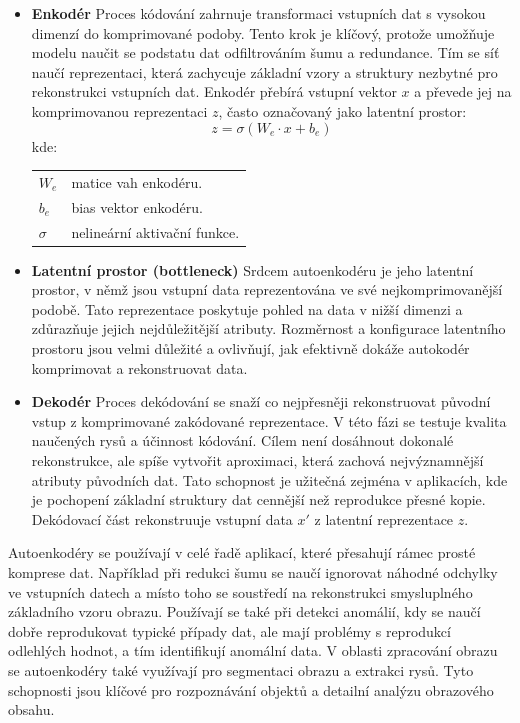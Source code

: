 \documentclass[male,czech,api_ing]{thesis}
\makeatletter
\newenvironment{conditions}[1][kde:]
    {#1 \begin{tabular}[t]{>{$}l<{$} @{${}={}$} >{\raggedright\arraybackslash}p{10cm}}}
    {\end{tabular}}
\makeatother
\begin{document}
\begin{itemize}
    \item \textbf{Enkodér} Proces kódování zahrnuje transformaci vstupních dat s vysokou dimenzí do komprimované podoby. Tento krok je klíčový, protože umožňuje modelu naučit se podstatu dat odfiltrováním šumu a redundance. Tím se síť naučí reprezentaci, která zachycuje základní vzory a struktury nezbytné pro rekonstrukci vstupních dat. Enkodér přebírá vstupní vektor $x$ a převede jej na komprimovanou reprezentaci $z$, často označovaný jako latentní prostor:
    \begin{equation}
        z = \sigma(W_e \cdot x + b_e)
    \end{equation}
    \begin{conditions}
        W_e & matice vah enkodéru. \\
        b_e & bias vektor enkodéru. \\
        \sigma & nelineární aktivační funkce.
    \end{conditions}
    \item \textbf{Latentní prostor (bottleneck)} Srdcem autoenkodéru je jeho latentní prostor, v němž jsou vstupní data reprezentována ve své nejkomprimovanější podobě. Tato reprezentace poskytuje pohled na data v nižší dimenzi a zdůrazňuje jejich nejdůležitější atributy. Rozměrnost a konfigurace latentního prostoru jsou velmi důležité a ovlivňují, jak efektivně dokáže autokodér komprimovat a rekonstruovat data.
    \item \textbf{Dekodér} Proces dekódování se snaží co nejpřesněji rekonstruovat původní vstup z komprimované zakódované reprezentace. V této fázi se testuje kvalita naučených rysů a účinnost kódování. Cílem není dosáhnout dokonalé rekonstrukce, ale spíše vytvořit aproximaci, která zachová nejvýznamnější atributy původních dat. Tato schopnost je užitečná zejména v aplikacích, kde je pochopení základní struktury dat cennější než reprodukce přesné kopie. Dekódovací část rekonstruuje vstupní data $x'$ z latentní reprezentace $z$.
\end{itemize}

Autoenkodéry se používají v celé řadě aplikací, které přesahují rámec prosté komprese dat. Například při redukci šumu se naučí ignorovat náhodné odchylky ve vstupních datech a místo toho se soustředí na rekonstrukci smysluplného základního vzoru obrazu. Používají se také při detekci anomálií, kdy se naučí dobře reprodukovat typické případy dat, ale mají problémy s reprodukcí odlehlých hodnot, a tím identifikují anomální data. V oblasti zpracování obrazu se autoenkodéry také využívají pro segmentaci obrazu a extrakci rysů. Tyto schopnosti jsou klíčové pro rozpoznávání objektů a detailní analýzu obrazového obsahu. \cite{Autoencoders, AutoencodersIntroduction}
\end{document}
